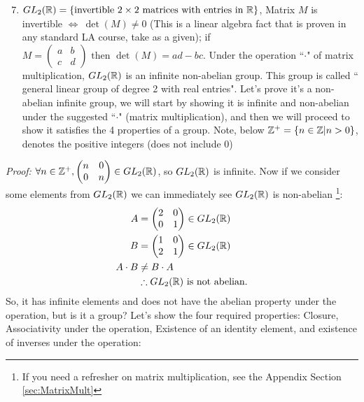 \begin{enumerate}
\setcounter{enumi}{6}
    \item $GL_2({\mathbb{R}})=\{\text{invertible } 2\times 2 \text{ matrices with entries in } {\mathbb{R}}\}$, Matrix $M$ is invertible $\iff  \ \det(M)\neq 0$ (This is a linear algebra fact that is proven in any standard LA course, take as a given); if $M= 	\left(\begin{matrix}
a & b \\
c & d
\end{matrix}\right) \text{ then } \det(M)=ad-bc$. Under the operation ``$\cdot$" of matrix multiplication, $GL_2({\mathbb{R}})$ is an infinite non-abelian group. This group is called `` general linear group of degree 2 with real entries". Let's prove it's a non-abelian infinite group, we will start by showing it is infinite and non-abelian under the suggested ``$\cdot$" (matrix multiplication), and then we will proceed to show it satisfies the 4 properties of a group. Note, below ${\mathbb{Z}}^+ = \{n\in {\mathbb{Z}}| n>0\}$, denotes the positive integers (does not include 0)\steezybreak

\end{enumerate}
\noindent \textit{Proof:} $\forall n \in {\mathbb{Z}}^+, \left(\begin{matrix}
n & 0 \\
0 & n
\end{matrix}\right) \in GL_2({\mathbb{R}})$, so $GL_2({\mathbb{R}})$ is infinite. Now if we consider some elements from $GL_2({\mathbb{R}})$ we can immediately see $GL_2({\mathbb{R}})$ is non-abelian \footnote{If you need a refresher on matrix multiplication, see the Appendix Section \ref{sec:MatrixMult}}:
\begin{align}
    A &= \left(\begin{matrix}
2 & 0 \\
0 & 1
\end{matrix}\right) \in GL_2({\mathbb{R}}) \nonumber \\
B &= \left(\begin{matrix}
1 & 0 \\
2 & 1
\end{matrix}\right) \in GL_2({\mathbb{R}}) \nonumber \\
A\cdot B &\neq B\cdot A \nonumber \\
&\therefore GL_2({\mathbb{R}}) \text{ is not abelian.} \nonumber
\end{align}
So, it has infinite elements and does not have the abelian property under the operation, but is it a
group? Let's show the four required properties: Closure, Associativity under the operation,
Existence of an identity element, and existence of inverses under the operation:
